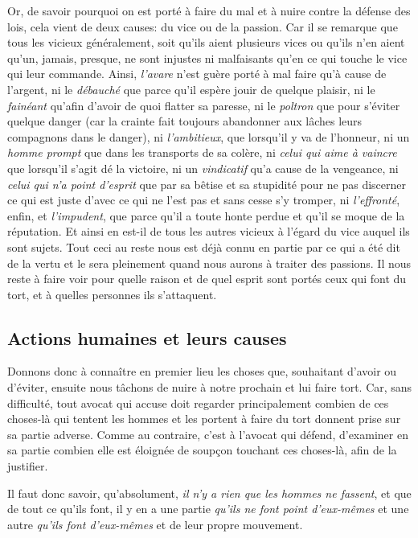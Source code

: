 Or, de savoir pourquoi on est porté à faire du mal et à nuire contre la défense des lois, cela vient de deux causes:
du vice ou de la passion. Car il se remarque que tous les vicieux généralement, soit qu'ils aient plusieurs vices ou
qu'ils  n'en aient qu'un, jamais, presque, ne sont injustes ni malfaisants qu'en ce qui touche le vice qui leur
commande. Ainsi, \emph{l'avare} n'est guère porté à mal faire qu'à cause de l'argent, ni le \emph{débauché} que parce
qu'il espère jouir de quelque plaisir, ni le \emph{fainéant} qu'afin d'avoir de quoi flatter sa paresse, ni le
\emph{poltron} que pour s'éviter quelque danger (car la crainte fait toujours abandonner aux lâches leurs compagnons
dans le danger), ni \emph{l'ambitieux}, que lorsqu'il y va de l'honneur, ni un \emph{homme prompt} que dans les
transports de sa colère, ni \emph{celui qui aime à vaincre} que lorsqu'il s'agit dé la victoire, ni un \emph{vindicatif}
qu'a cause de la vengeance, ni \emph{celui qui n'a point d'esprit} que par sa bêtise et sa stupidité pour ne pas discerner
ce qui est juste d'avec ce qui ne l'est pas et sans cesse s'y tromper, ni \emph{l'effronté}, enfin, et \emph{l'impudent},
que parce qu'il a toute honte perdue et qu'il se moque de la réputation. Et ainsi en est-il de tous les autres vicieux à
l'égard du vice auquel ils sont sujets. Tout ceci au reste nous est déjà connu en partie par ce qui a été dit de la vertu
et le sera pleinement quand nous aurons à traiter des passions. Il nous reste à faire voir pour quelle raison et de quel
esprit sont portés ceux qui font du tort, et à quelles personnes ils s'attaquent.

\subsection{Actions humaines et leurs causes}

Donnons donc à connaître en premier lieu les choses que, souhaitant d'avoir ou d'éviter, ensuite nous tâchons de nuire à
notre prochain et lui faire tort. Car, sans difficulté, tout avocat qui accuse doit regarder principalement combien de ces
choses-là qui tentent les hommes et les portent à faire du tort donnent prise sur sa partie adverse. Comme au contraire,
c'est à l'avocat qui défend, d'examiner en sa partie combien elle est éloignée de soupçon touchant ces choses-là, afin
de la justifier.

\bigbreak

Il faut donc savoir, qu'absolument, \emph{il n'y a rien que les hommes ne fassent}, et que de tout ce qu'ils font, il y en
a une partie \emph{qu'ils ne font point d'eux-mêmes} et une autre \emph{qu'ils font d'eux-mêmes} et de leur propre mouvement.

